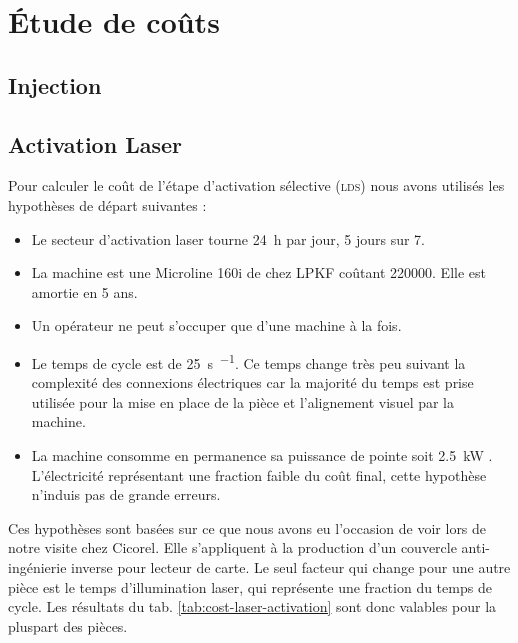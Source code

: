 \section{Étude de coûts}

\subsection{Injection}


\subsection{Activation Laser}
Pour calculer le coût de l'étape d'activation sélective (\textsc{lds}) nous avons utilisés les hypothèses de départ suivantes :
\begin{itemize}
    \item Le secteur d'activation laser tourne \SI{24}{\hour} par jour, 5 jours sur 7.
    \item La machine est une Microline 160i de chez LPKF coûtant \SI{220000}{\chf}.
        Elle est amortie en 5 ans.
    \item Un opérateur ne peut s'occuper que d'une machine à la fois.
    \item Le temps de cycle est de \SI{25}{\second\per\piece}.
        Ce temps change très peu suivant la complexité des connexions électriques car la majorité du temps est prise utilisée pour la mise en place de la pièce et l'alignement visuel par la machine.
    \item La machine consomme en permanence sa puissance de pointe soit \SI{2.5}{\kilo\watt} \cite{lpkf-microline-series}.
        L'électricité représentant une fraction faible du coût final, cette hypothèse n'induis pas de grande erreurs.
\end{itemize}

Ces hypothèses sont basées sur ce que nous avons eu l'occasion de voir lors de notre visite chez Cicorel.
Elle s'appliquent à la production d'un couvercle anti-ingénierie inverse pour lecteur de carte.
Le seul facteur qui change pour une autre pièce est le temps d'illumination laser, qui représente une fraction du temps de cycle.
Les résultats du tab. \ref{tab:cost-laser-activation} sont donc valables pour la pluspart des pièces.


